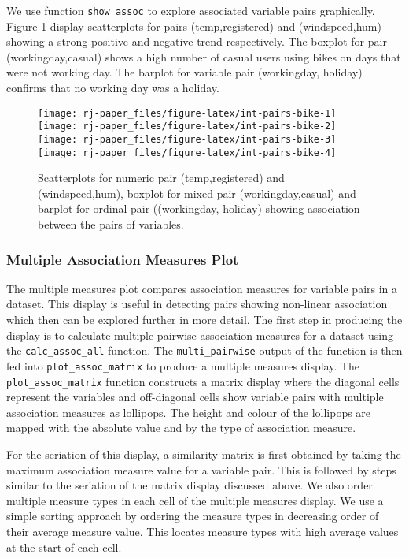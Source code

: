 We use function \texttt{show\_assoc} to explore associated variable pairs graphically. Figure \ref{fig:int-pairs-bike} display scatterplots for pairs (temp,registered) and (windspeed,hum) showing a strong positive and negative trend respectively. The boxplot for pair (workingday,casual) shows a high number of casual users using bikes on days that were not working day. The barplot for variable pair (workingday, holiday) confirms that no working day was a holiday.

\begin{figure}
\texttt{[image: rj-paper\_files/figure-latex/int-pairs-bike-1]} \texttt{[image: rj-paper\_files/figure-latex/int-pairs-bike-2]} \texttt{[image: rj-paper\_files/figure-latex/int-pairs-bike-3]} \texttt{[image: rj-paper\_files/figure-latex/int-pairs-bike-4]} \caption{Scatterplots for numeric pair (temp,registered) and (windspeed,hum),  boxplot for mixed pair (workingday,casual) and barplot for ordinal pair ((workingday, holiday) showing association between the pairs of variables.}\label{fig:int-pairs-bike}
\end{figure}

\hypertarget{multiple-association-measures-plot}{%
\subsubsection{Multiple Association Measures Plot}\label{multiple-association-measures-plot}}

The multiple measures plot compares association measures for variable pairs in a dataset. This display is useful in detecting pairs showing non-linear association which then can be explored further in more detail. The first step in producing the display is to calculate multiple pairwise association measures for a dataset using the \texttt{calc\_assoc\_all} function. The \texttt{multi\_pairwise} output of the function is then fed into \texttt{plot\_assoc\_matrix} to produce a multiple measures display. The \texttt{plot\_assoc\_matrix} function constructs a matrix display where the diagonal cells represent the variables and off-diagonal cells show variable pairs with multiple association measures as lollipops. The height and colour of the lollipops are mapped with the absolute value and by the type of association measure.

For the seriation of this display, a similarity matrix is first obtained by taking the maximum association measure value for a variable pair. This is followed by steps similar to the seriation of the matrix display discussed above. We also order multiple measure types in each cell of the multiple measures display. We use a simple sorting approach by ordering the measure types in decreasing order of their average measure value. This locates measure types with high average values at the start of each cell.

